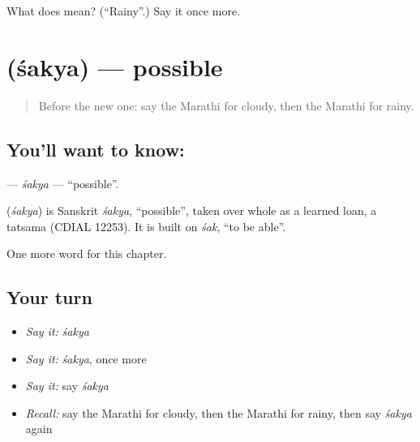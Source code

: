 \begin{tcolorbox}[breakable,colback=teal!4,colframe=teal!35!black,title={Before you move on}]
What does  mean? (\textquotedblleft{}Rainy\textquotedblright{}.) Say it once more.
\end{tcolorbox}
\section[\texorpdfstring{\mr{शक्य} (śakya)}{शक्य (śakya)}]{ (śakya) — possible}

\label{lesson:MR-C176-sakya}



\begin{quote}
Before the new one: say the Marathi for cloudy, then the Marathi for rainy.
\end{quote}

\subsection*{You'll want to know: }
\textbf{} — \emph{śakya} — \textquotedblleft{}possible\textquotedblright{}.

\begin{cousinweb}
\textbf{} (\emph{śakya}) is Sanskrit \emph{śakya}, \textquotedblleft{}possible\textquotedblright{}, taken over whole as a learned loan, a tatsama (CDIAL 12253). It is built on \emph{śak}, \textquotedblleft{}to be able\textquotedblright{}.
\end{cousinweb}

\begin{grammarlens}[title={What you've built}]
One more word for this chapter.
\end{grammarlens}

\subsection*{Your turn}
\begin{itemize}
\raggedright
  \item \emph{Say it:} \emph{śakya}
  \item \emph{Say it:} \emph{śakya}, once more
  \item \emph{Say it:} say \emph{śakya}
  \item \emph{Recall:} say the Marathi for cloudy, then the Marathi for rainy, then say \emph{śakya} again
\end{itemize}

